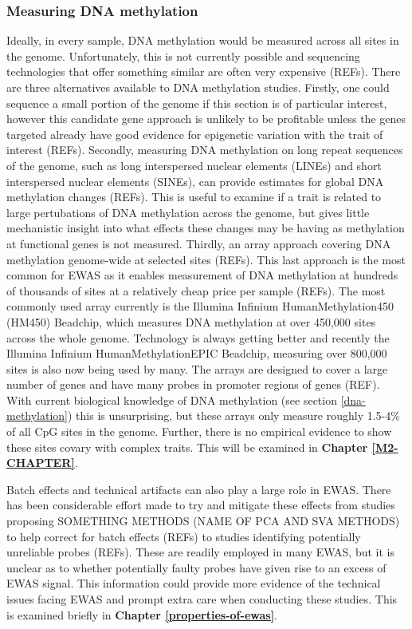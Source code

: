\documentclass[11pt,twoside]{bristolthesis}
\begin{document}
\hypertarget{measuring-dna-methylation}{%
\subsubsection{Measuring DNA methylation}\label{measuring-dna-methylation}}

Ideally, in every sample, DNA methylation would be measured across all sites in the genome. Unfortunately, this is not currently possible and sequencing technologies that offer something similar are often very expensive (REFs). There are three alternatives available to DNA methylation studies. Firstly, one could sequence a small portion of the genome if this section is of particular interest, however this candidate gene approach is unlikely to be profitable unless the genes targeted already have good evidence for epigenetic variation with the trait of interest (REFs). Secondly, measuring DNA methylation on long repeat sequences of the genome, such as long interspersed nuclear elements (LINEs) and short interspersed nuclear elements (SINEs), can provide estimates for global DNA methylation changes (REFs). This is useful to examine if a trait is related to large pertubations of DNA methylation across the genome, but gives little mechanistic insight into what effects these changes may be having as methylation at functional genes is not measured. Thirdly, an array approach covering DNA methylation genome-wide at selected sites (REFs). This last approach is the most common for EWAS as it enables measurement of DNA methylation at hundreds of thousands of sites at a relatively cheap price per sample (REFs). The most commonly used array currently is the Illumina Infinium HumanMethylation450 (HM450) Beadchip, which measures DNA methylation at over 450,000 sites across the whole genome. Technology is always getting better and recently the Illumina Infinium HumanMethylationEPIC Beadchip, measuring over 800,000 sites is also now being used by many. The arrays are designed to cover a large number of genes and have many probes in promoter regions of genes (REF). With current biological knowledge of DNA methylation (see section \ref{dna-methylation}) this is unsurprising, but these arrays only measure roughly 1.5-4\% of all CpG sites in the genome. Further, there is no empirical evidence to show these sites covary with complex traits. This will be examined in \textbf{Chapter \ref{M2-CHAPTER}}.

Batch effects and technical artifacts can also play a large role in EWAS. There has been considerable effort made to try and mitigate these effects from studies proposing SOMETHING METHODS (NAME OF PCA AND SVA METHODS) to help correct for batch effects (REFs) to studies identifying potentially unreliable probes (REFs). These are readily employed in many EWAS, but it is unclear as to whether potentially faulty probes have given rise to an excess of EWAS signal. This information could provide more evidence of the technical issues facing EWAS and prompt extra care when conducting these studies. This is examined briefly in \textbf{Chapter \ref{properties-of-ewas}}.
\end{document}
